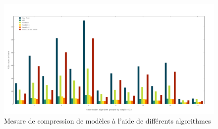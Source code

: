 \begin{figure}[ht!]
\centering
\includegraphics[scale=0.3]{images/compression.png}
\caption{Mesure de compression de modèles à l'aide de différents algorithmes}
\end{figure}
